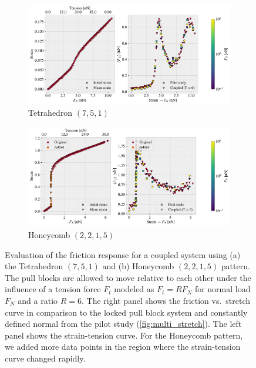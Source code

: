 \begin{figure}[H]
  \centering
  \begin{subfigure}[t]{\textwidth}
      \centering
      \includegraphics[width=\textwidth]{figures/negative_coefficient/manual_coupling_tension_pop7_5_1.pdf}
      \caption{Tetrahedron $(7,5,1)$}
  \end{subfigure}
  \hfill
  \begin{subfigure}[t]{\textwidth}
    \centering
    \includegraphics[width=\textwidth]{figures/negative_coefficient/manual_coupling_tension_hon2215.pdf}
    \caption{Honeycomb $(2,2,1,5)$}
  \end{subfigure}
  \hfill
  \caption{Evaluation of the friction response for a coupled system using (a) the Tetrahedron $(7,5,1)$ and (b) Honeycomb $(2,2,1,5)$ pattern.  The pull blocks are allowed to move relative to each other under the influence of a tension force $F_t$ modeled as $F_t = RF_N$ for normal load $F_N$ and a ratio $R=6$. The right panel shows the friction vs.\ stretch curve in comparison to the locked pull block system and constantly defined normal from the pilot study (\cref{fig:multi_stretch}). The left panel shows the strain-tension curve. For the Honeycomb pattern, we added more data points in the region where the strain-tension curve changed rapidly.}
  \label{fig:negfric}
\end{figure}

